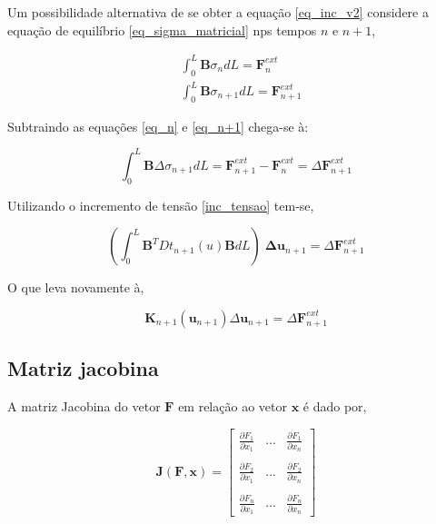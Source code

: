 \documentclass[12pt,a4paper]{article}
\newcommand{\diff}[1]{d#1}
\begin{document}
Um possibilidade alternativa de se obter a equação \ref{eq_inc_v2} considere a equação de equilíbrio \ref{eq_sigma_matricial} nps tempos $n$ e $n+1$,

\begin{align}
&\int_0^L \mathbf{B} \sigma_n \diff{L}  = \mathbf{F}^{ext}_n \label{eq_n}\\
&\int_0^L \mathbf{B} \sigma_{n+1} \diff{L}  = \mathbf{F}^{ext}_{n+1} \label{eq_n+1}
\end{align}
 
Subtraindo as equações \ref{eq_n} e \ref{eq_n+1} chega-se à:

\begin{equation}
\int_0^L \mathbf{B} \Delta \sigma_{n+1} \diff{L}  = \mathbf{F}^{ext}_{n+1} - \mathbf{F}^{ext}_n = \Delta\mathbf{F}^{ext}_{n+1}
\end{equation}

Utilizando o incremento de tensão \ref{inc_tensao} tem-se,

\begin{equation}
\left(\int_0^L \mathbf{B}^T Dt_{n+1}\left(u\right) \mathbf{B} \diff{L}\right) \; \mathbf{\Delta u}_{n+1} = \Delta\mathbf{F}^{ext}_{n+1}
\end{equation}

\noindent 

O que leva novamente à,

\begin{equation}
\mathbf{K}_{n+1}(\mathbf{u}_{n+1}) \Delta \mathbf{u}_{n+1} = \Delta \mathbf{F}^{ext}_{n+1} 
\label{eq_inc_v3}
\end{equation}

\subsection{Matriz jacobina}

A matriz Jacobina do vetor $\mathbf{F}$ em relação ao vetor $\mathbf{x}$ é dado por, 

\begin{equation}
\mathbf{J}(\mathbf{F}, \mathbf{x}) = 
\begin{bmatrix}
	\frac{\partial F_1}{\partial x_1} & ... & \frac{\partial F_1}{\partial x_n}\\ 
	\\
	\frac{\partial F_2}{\partial x_1} & ... & \frac{\partial F_2}{\partial x_n}\\ 
	\\
	\frac{\partial F_n}{\partial x_1} & ... & \frac{\partial F_n}{\partial x_n}
\end{bmatrix}
\end{equation}
\end{document}
